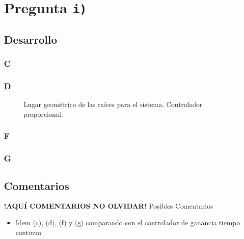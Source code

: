 \section{Pregunta \texttt{i)}}\label{pregunta-i}
\subsection{Desarrollo}

\subsubsection{C} %



\FloatBarrier
\subsubsection{D}%

\begin{figure}[ht]
    \centering
    
    \caption{Lugar geométrico de las raíces para el sistema. Controlador proporcional.}
    \label{fig:lgr-i}
  \end{figure}

\FloatBarrier
\subsubsection{F}%

\FloatBarrier
\subsubsection{G}%

\FloatBarrier
\subsection{Comentarios}


\textbf{!AQUÍ COMENTARIOS NO OLVIDAR!}
Posibles Comentarios
\begin{itemize}
    \item Idem (c), (d), (f) y (g) comparando con el controlador de ganancia tiempo continuo
\end{itemize}
